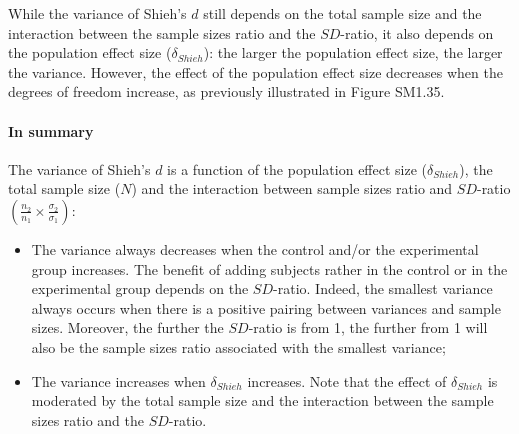 \documentclass[
  english,
  man,mask,floatsintext]{apa6}
\let\oldparagraph\paragraph
\renewcommand{\paragraph}[1]{\oldparagraph{#1}\mbox{}}
\begin{document}
While the variance of Shieh's \(d\) still depends on the total sample size and the interaction between the sample sizes ratio and the \(SD\)-ratio, it also depends on the population effect size (\(\delta_{Shieh}\)): the larger the population effect size, the larger the variance. However, the effect of the population effect size decreases when the degrees of freedom increase, as previously illustrated in Figure SM1.35.

\hypertarget{in-summary-4}{%
\paragraph{In summary}\label{in-summary-4}}

The variance of Shieh's \(d\) is a function of the population effect size (\(\delta_{Shieh}\)), the total sample size (\(N\)) and the interaction between sample sizes ratio and \(SD\)-ratio \(\left(\frac{n_2}{n_1}\times\frac{\sigma_2}{\sigma_1} \right)\):

\begin{itemize}
\item
  The variance always decreases when the control and/or the experimental group increases. The benefit of adding subjects rather in the control or in the experimental group depends on the \(SD\)-ratio. Indeed, the smallest variance always occurs when there is a positive pairing between variances and sample sizes. Moreover, the further the \(SD\)-ratio is from 1, the further from 1 will also be the sample sizes ratio associated with the smallest variance;
\item
  The variance increases when \(\delta_{Shieh}\) increases. Note that the effect of \(\delta_{Shieh}\) is moderated by the total sample size and the interaction between the sample sizes ratio and the \(SD\)-ratio.
\end{itemize}
\end{document}
